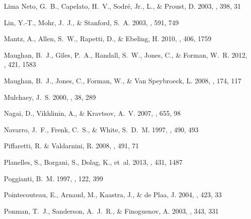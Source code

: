 \documentclass{aa}
\begin{document}
\begin{thebibliography}{61}
{Lima Neto}, G.~B., {Capelato}, H.~V., {Sodr{\'e}}, Jr., L., \& {Proust}, D.
  2003, \aap, 398, 31

{Lin}, Y.-T., {Mohr}, J.~J., \& {Stanford}, S.~A. 2003, \apj, 591, 749

{Mantz}, A., {Allen}, S.~W., {Rapetti}, D., \& {Ebeling}, H. 2010, \mnras, 406,
  1759

{Maughan}, B.~J., {Giles}, P.~A., {Randall}, S.~W., {Jones}, C., \& {Forman},
  W.~R. 2012, \mnras, 421, 1583

{Maughan}, B.~J., {Jones}, C., {Forman}, W., \& {Van Speybroeck}, L. 2008,
  \apjs, 174, 117

{Mulchaey}, J.~S. 2000, \araa, 38, 289

{Nagai}, D., {Vikhlinin}, A., \& {Kravtsov}, A.~V. 2007, \apj, 655, 98

{Navarro}, J.~F., {Frenk}, C.~S., \& {White}, S.~D.~M. 1997, \apj, 490, 493

{Piffaretti}, R. \& {Valdarnini}, R. 2008, \aap, 491, 71

{Planelles}, S., {Borgani}, S., {Dolag}, K., {et~al.} 2013, \mnras, 431, 1487

{Poggianti}, B.~M. 1997, \aaps, 122, 399

{Pointecouteau}, E., {Arnaud}, M., {Kaastra}, J., \& {de Plaa}, J. 2004, \aap,
  423, 33

{Ponman}, T.~J., {Sanderson}, A.~J.~R., \& {Finoguenov}, A. 2003, \mnras, 343,
  331


\end{thebibliography}
\end{document}
